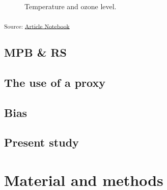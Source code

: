 \documentclass[
  letterpaper,
  DIV=11,
  numbers=noendperiod]{scrartcl}
\begin{document}
\label{cell-fig-airquality}
\begin{figure}[H]


\caption{\label{fig-airquality}Temperature and ozone level.}

\end{figure}%

\textsubscript{Source:
\href{https://AugustinDebly.github.io/Scaling_bias/index.qmd.html}{Article
Notebook}}

\subsection{MPB \& RS}\label{mpb-rs}

\subsection{The use of a proxy}\label{the-use-of-a-proxy}

\subsection{Bias}\label{bias}

\subsection{Present study}\label{present-study}

\section{Material and methods}\label{material-and-methods}
\end{document}
